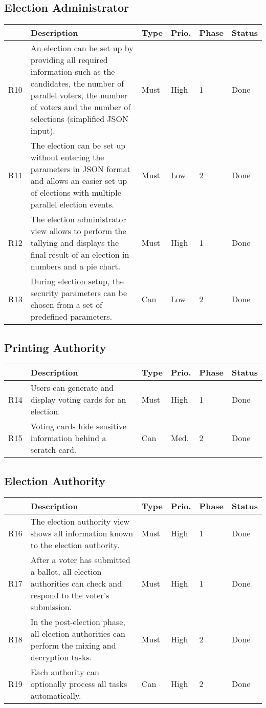 \subsection{Election Administrator}
\begin{longtable}{p{0.5cm}p{9cm}p{1cm}p{1cm}p{1cm}p{1cm}}
\hline
 & Description & Type & Prio. & Phase & Status\\
\hline
R10 & An election can be set up by providing all required information such as the candidates, the number of parallel voters, the number of voters and the number of selections (simplified JSON input). & Must & High & 1 & Done\\
R11 & The election can be set up without entering the parameters in JSON format and allows an easier set up of elections with multiple parallel election events. & Must & Low & 2 & Done\\
R12 & The election administrator view allows to perform the tallying and displays the final result of an election in numbers and a pie chart. & Must & High & 1 & Done\\
R13 &  During election setup, the security parameters can be chosen from a set of predefined parameters. & Can & Low & 2 & Done\\
\end{longtable}

\subsection{Printing Authority}
\begin{longtable}{p{0.5cm}p{9cm}p{1cm}p{1cm}p{1cm}p{1cm}}
\hline
 & Description & Type & Prio. & Phase & Status\\
\hline
R14 & Users can generate and display voting cards for an election. & Must & High & 1 & Done\\
R15 & Voting cards hide sensitive information behind a scratch card. & Can & Med. & 2 & Done\\
\end{longtable}

\subsection{Election Authority}
\begin{longtable}{p{0.5cm}p{9cm}p{1cm}p{1cm}p{1cm}p{1cm}}
\hline
 & Description & Type & Prio. & Phase & Status\\
\hline
R16 & The election authority view shows all information known to the election authority. & Must & High & 1 & Done\\
R17 & After a voter has submitted a ballot, all election authorities can check and respond to the voter's submission. & Must & High & 1 & Done\\
R18 & In the post-election phase, all election authorities can perform the mixing and decryption tasks. & Must & High & 2 & Done\\
R19 & Each authority can optionally process all tasks automatically. & Can & High & 2 & Done\\
\end{longtable}


